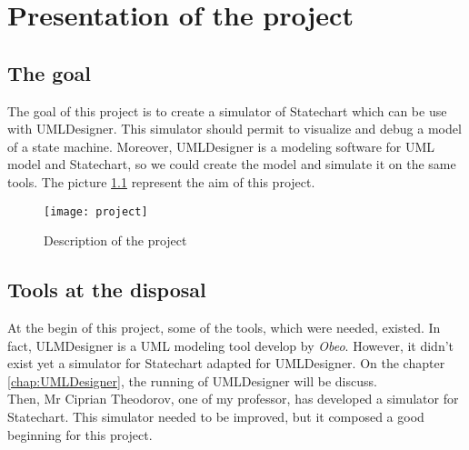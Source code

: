 
\chapter{Presentation of the project}

\section{The goal}

The goal of this project is to create a simulator of Statechart which can be use with UMLDesigner. This simulator should permit to visualize and debug a model of a state machine. Moreover, UMLDesigner is a modeling software for UML model and Statechart, so we could create the model and simulate it on the same tools. The picture \ref{fig:project} represent the aim of this project.

\begin{figure}[h]
  \centering
\texttt{[image: project]}  
  \caption{Description of the project}
  \label{fig:project}
\end{figure}


\section{Tools at the disposal}

At the begin of this project, some of the tools, which were needed, existed. In fact, ULMDesigner is a UML modeling tool develop by \textit{Obeo}. However, it didn't exist yet a simulator for Statechart adapted for UMLDesigner. On the chapter \ref{chap:UMLDesigner}, the running of UMLDesigner will be discuss.~\\

Then, Mr Ciprian Theodorov, one of my professor, has developed a simulator for Statechart. This simulator needed to be improved, but it composed a good beginning for this project. 



